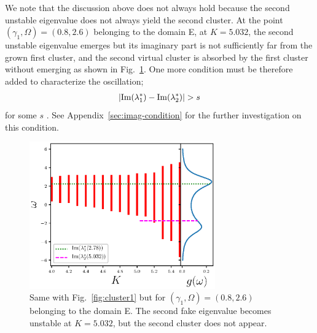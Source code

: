 We note that the discussion above does not always hold
because the second unstable eigenvalue
does not always yield the second cluster.
At the point $(\gamma_{1},\Omega)=(0.8,2.6)$ belonging to the domain E,
at $K=5.032$, the second unstable eigenvalue emerges
but its imaginary part is not sufficiently far from
the grown first cluster,
and the second virtual cluster is absorbed by the first cluster
without emerging as shown in Fig.~\ref{fig:cluster2}.
One more condition must be therefore added to characterize the oscillation;
\begin{align}
  |{\rm Im}(\lambda_{1}^{\ast})-{\rm Im}(\lambda_{2}^{\ast})|>s
  \label{eq:imag-condition}
\end{align}
for some $s$ \cite{barre-yamaguchi-09}.
See Appendix~\ref{sec:imag-condition} for the further investigation on this condition.

\begin{figure}[htbp]
\begin{center}
  \includegraphics[width=8cm]{figs/cluster2.eps}
\end{center}
  \caption{
    Same with Fig.~\ref{fig:cluster1} but for $(\gamma_{1},\Omega)=(0.8,2.6)$
    belonging to the domain E.
    The second fake eigenvalue becomes unstable at $K=5.032$,
    but the second cluster does not appear.}
  \label{fig:cluster2}
\end{figure}

